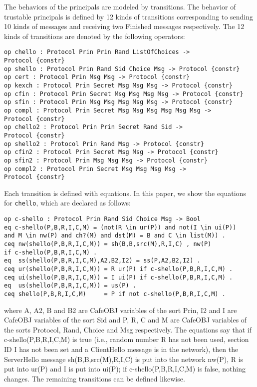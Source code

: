 \documentclass[a4paper,fleqn]{cas-dc}
\begin{document}
The behaviors of the principals are modeled by transitions. The behavior of trustable principals is defined by 12 kinds of transitions corresponding to sending 10 kinds of messages and receiving two Finished messages respectively.
The 12 kinds of transitions are denoted by the following operators:
\begin{small}
\begin{verbatim}
op chello : Protocol Prin Prin Rand ListOfChoices ->
Protocol {constr}
op shello : Protocol Prin Rand Sid Choice Msg -> Protocol {constr}
op cert : Protocol Prin Msg Msg -> Protocol {constr}
op kexch : Protocol Prin Secret Msg Msg Msg -> Protocol {constr}
op cfin : Protocol Prin Secret Msg Msg Msg Msg -> Protocol {constr}
op sfin : Protocol Prin Msg Msg Msg Msg Msg -> Protocol {constr}
op compl : Protocol Prin Secret Msg Msg Msg Msg Msg Msg ->
Protocol {constr}
op chello2 : Protocol Prin Prin Secret Rand Sid -> 
Protocol {constr}
op shello2 : Protocol Prin Rand Msg -> Protocol {constr}
op cfin2 : Protocol Prin Secret Msg Msg -> Protocol {constr}
op sfin2 : Protocol Prin Msg Msg Msg -> Protocol {constr}
op compl2 : Protocol Prin Secret Msg Msg Msg Msg -> 
Protocol {constr} 
\end{verbatim}
\end{small}	
Each transition is defined with equations.
In this paper, we show the equations for \verb!chello!, which are declared as follows:
\begin{small}
\begin{verbatim}
op c-shello : Protocol Prin Rand Sid Choice Msg -> Bool
eq c-shello(P,B,R,I,C,M) = (not(R \in ur(P)) and not(I \in ui(P)) 
and M \in nw(P) and ch?(M) and dst(M) = B and C \in list(M)) .
ceq nw(shello(P,B,R,I,C,M)) = sh(B,B,src(M),R,I,C) , nw(P) 
if c-shello(P,B,R,I,C,M) .
eq  ss(shello(P,B,R,I,C,M),A2,B2,I2) = ss(P,A2,B2,I2) .
ceq ur(shello(P,B,R,I,C,M)) = R ur(P) if c-shello(P,B,R,I,C,M) .
ceq ui(shello(P,B,R,I,C,M)) = I ui(P) if c-shello(P,B,R,I,C,M) .
eq  us(shello(P,B,R,I,C,M)) = us(P) .
ceq shello(P,B,R,I,C,M)     = P if not c-shello(P,B,R,I,C,M) .
\end{verbatim}
\end{small}	
where A, A2, B and B2 are CafeOBJ variables of the sort Prin, I2 and I are CafeOBJ variables of the sort Sid and P, R, C and M are CafeOBJ variables of the sorts Protocol, Rand, Choice and Msg respectively.
The  equations  say  that  if c-shello(P,B,R,I,C,M) is  true
(i.e., random number R has not been used, section ID I has not been set and a ClientHello message is in the network), then the ServerHello message sh(B,B,src(M),R,I,C) is put into the network nw(P), R is put into ur(P) and I is put into ui(P); if c-shello(P,B,R,I,C,M) is  false,  nothing  changes.  The remaining transitions can be defined likewise.
\end{document}
